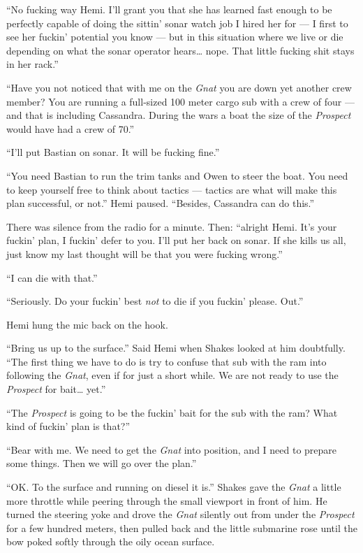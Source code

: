\documentclass[
]{scrbook}
\begin{document}
``No fucking way Hemi. I'll grant you that she has learned fast enough
to be perfectly capable of doing the sittin' sonar watch job I hired her
for --- I first to see her fuckin' potential you know --- but in this
situation where we live or die depending on what the sonar operator
hears\ldots{} nope. That little fucking shit stays in her rack.''

``Have you not noticed that with me on the \emph{Gnat} you are down yet
another crew member? You are running a full-sized 100 meter cargo sub
with a crew of four --- and that is including Cassandra. During the wars
a boat the size of the \emph{Prospect} would have had a crew of 70.''

``I'll put Bastian on sonar. It will be fucking fine.''

``You need Bastian to run the trim tanks and Owen to steer the boat. You
need to keep yourself free to think about tactics --- tactics are what
will make this plan successful, or not.'' Hemi paused. ``Besides,
Cassandra can do this.''

There was silence from the radio for a minute. Then: ``alright Hemi.
It's your fuckin' plan, I fuckin' defer to you. I'll put her back on
sonar. If she kills us all, just know my last thought will be that you
were fucking wrong.''

``I can die with that.''

``Seriously. Do your fuckin' best \emph{not} to die if you fuckin'
please. Out.''

Hemi hung the mic back on the hook.

``Bring us up to the surface.'' Said Hemi when Shakes looked at him
doubtfully. ``The first thing we have to do is try to confuse that sub
with the ram into following the \emph{Gnat}, even if for just a short
while. We are not ready to use the \emph{Prospect} for bait\ldots{}
yet.''

``The \emph{Prospect} is going to be the fuckin' bait for the sub with
the ram? What kind of fuckin' plan is that?''

``Bear with me. We need to get the \emph{Gnat} into position, and I need
to prepare some things. Then we will go over the plan.''

``OK. To the surface and running on diesel it is.'' Shakes gave the
\emph{Gnat} a little more throttle while peering through the small
viewport in front of him. He turned the steering yoke and drove the
\emph{Gnat} silently out from under the \emph{Prospect} for a few
hundred meters, then pulled back and the little submarine rose until the
bow poked softly through the oily ocean surface.
\end{document}
